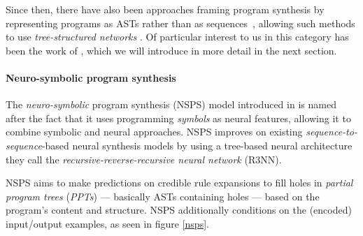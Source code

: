 \documentclass{article}
\begin{document}
Since then, there have also been approaches framing program synthesis by representing programs as ASTs rather than as sequences~\citep{polosukhin2018neural},
allowing such methods to use \emph{tree-structured networks}%
.
Of particular interest to us in this category has been the work of \citet{nsps},
which we will introduce in more detail in the next section.

\paragraph{Neuro-symbolic program synthesis} \label{sec:nsps}

The \emph{neuro-symbolic} program synthesis (NSPS) model introduced in \citet{nsps} is named after the fact that it uses programming \emph{symbols} as neural features,
allowing it to combine symbolic and neural approaches.
NSPS improves on existing \emph{sequence-to-sequence}-based neural synthesis models by using a tree-based neural architecture they call the \emph{recursive-reverse-recursive neural network} (R3NN).

NSPS aims to make predictions on credible rule expansions to fill holes
in \emph{partial program trees} (\emph{PPTs}) --- basically ASTs containing holes --- based on the program's content and structure.
NSPS additionally conditions on the (encoded) input/output examples, as seen in figure \ref{nsps}.
\end{document}
